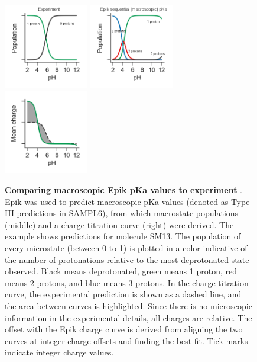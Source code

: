 \documentclass[9pt,lineno,final]{elife}
\begin{document}
\begin{figure}[H]
	\centering
	\includegraphics[width=0.33\textwidth]{Reports/Experiment-populations-SM13-titled.png}
	\includegraphics[width=0.33\textwidth]{Reports/Epik-TypeIII-populations-SM13-titled.png}
	\includegraphics[width=0.33\textwidth]{Reports/Epik-TypeIII-virtual-titration-SM13.png}
		\caption{{\bf Comparing macroscopic Epik pKa values to experiment} . Epik was used to predict macroscopic pKa values (denoted as Type III predictions in SAMPL6), from which macrostate populations (middle) and a charge titration curve (right) were derived.  The example shows predictions for molecule SM13. The population of every microstate (between 0 to 1) is plotted in a color indicative of the number of protonations relative to the most deprotonated state observed. Black means deprotonated, green means 1 proton, red means 2 protons, and blue means 3 protons. In the charge-titration curve, the experimental prediction is shown as a dashed line, and the area between curves is highlighted. Since there is no microscopic information in the experimental details, all charges are relative. The offset with the Epik charge curve is derived from aligning the two curves at integer charge offsets and finding the best fit. Tick marks indicate integer charge values.  
	\label{fig:epikiii-prediction}}
\end{figure}
\end{document}
